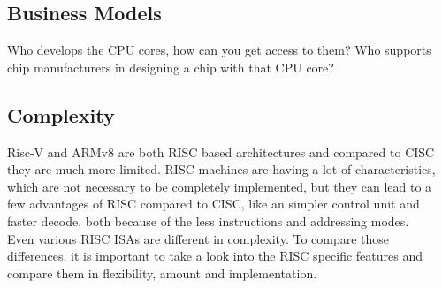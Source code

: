 \documentclass[conference]{IEEEtran}
\begin{document}
	\subsection{Business Models}
	Who develops the CPU cores, how can you get access to them? Who supports chip manufacturers in designing a chip with that CPU core?
	\subsection{Complexity}
	Risc-V and ARMv8 are both \gls{RISC} based architectures and compared to \gls{CISC} they are much more limited. \gls{RISC} machines are having a lot of characteristics, which are not necessary to be completely implemented, but they can lead to a few advantages of \gls{RISC} compared to \gls{CISC},  like an simpler control unit and faster decode, both because of the less instructions and addressing modes. \cite{George1990}\\
	Even various \gls{RISC} \glspl{ISA} are different in complexity. To compare those differences, it is important to take a look into the RISC specific features and compare them in flexibility, amount and implementation.
\end{document}
